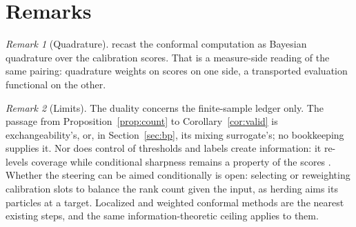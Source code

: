 \documentclass[11pt]{article}
\theoremstyle{remark}
\newtheorem{remark}{Remark}
\begin{document}
\section{Remarks}\label{sec:remarks}

\begin{remark}[Quadrature]
\citet{snellgriffiths2025} recast the conformal computation as Bayesian quadrature over the
calibration scores. That is a measure-side reading of the same pairing: quadrature weights on
scores on one side, a transported evaluation functional on the other.
\end{remark}

\begin{remark}[Limits]
The duality concerns the finite-sample ledger only. The passage from
Proposition~\ref{prop:count} to Corollary~\ref{cor:valid} is exchangeability's, or, in
Section~\ref{sec:bp}, its mixing surrogate's; no bookkeeping supplies it. Nor does control of
thresholds and labels create information: it re-levels coverage while conditional sharpness
remains a property of the scores \citep{cotton_marginally}. Whether the steering can be aimed conditionally is open: selecting or reweighting calibration slots to balance the rank count given the input, as herding aims its particles at a target. Localized and weighted conformal
methods are the nearest existing steps, and the same information-theoretic ceiling applies to
them.
\end{remark}



\end{document}
